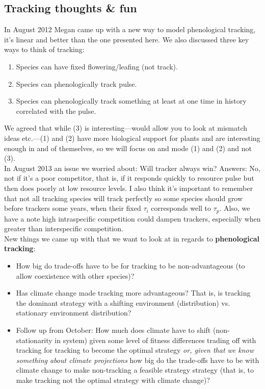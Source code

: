 \documentclass[11pt,a4paper,oneside]{article}
\begin{document}
\subsection{Tracking thoughts \& fun}
In August 2012 Megan came up with a new way to model phenological tracking, it's linear and better than the one presented here. We also discussed three key ways to think of tracking:
\begin{enumerate}
\item Species can have fixed flowering/leafing (not track).
\item Species can phenologically track pulse.
\item Species can phenologically track something at least at one time in history correlated with the pulse.
\end{enumerate}
We agreed that while (3) is interesting---would allow you to look at mismatch ideas etc.---(1) and (2) have more biological support for plants and are interesting enough in and of themselves, so we will focus on and mode (1) and (2) and not (3).\\

\noindent In August 2013 an issue we worried about: Will tracker always win? Answers: No, not if it's a poor competitor, that is, if it responds quickly to resource pulse but then does poorly at low resource levels. I also think it's important to remember that not all tracking species will track perfectly so some species should grow before trackers some years, when their fixed \(\tau_{i}\) corresponds well to \(\tau_{p}\). Also, we have a note high intraspecific competition could dampen trackers, especially when greater than interspecific competition.\\

\noindent New things we came up with that we want to look at in regards to {\bf phenological tracking}:
\begin{itemize}
\item How big do trade-offs have to be for tracking to be non-advantageous (to allow coexistence with other species)?
\item Has climate change made tracking more advantageous? That is, is tracking the dominant strategy with a shifting environment (distribution) vs. stationary environment distribution?
\item Follow up from October: How much does climate have to shift (non-stationarity in system) given some level of fitness differences trading off with tracking for tracking to become the optimal strategy \emph{or, given that we know something about climate projections} how big do the trade-offs have to be with climate change to make non-tracking a feasible strategy strategy (that is, to make tracking not the optimal strategy with climate change)?
\end{itemize}
\end{document}
